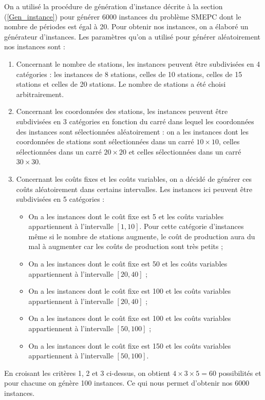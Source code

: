 On a utilisé la procédure de génération d'instance décrite à la section (\ref{Gen_instance}) pour générer 6000 instances du problème SMEPC dont le nombre de périodes est égal à 20. Pour obtenir nos instances, on a élaboré un générateur d'instances. Les paramètres qu'on a utilisé pour générer aléatoirement nos instances sont :
\begin{enumerate}
	\item Concernant le nombre de stations, les instances peuvent être subdivisées en 4 catégories : les instances de 8 stations, celles de 10 stations, celles de 15 stations et celles de 20  stations. Le nombre de stations a été choisi arbitrairement.
	\item Concernant les coordonnées des stations, les instances peuvent être subdivisées en 3 catégories en fonction du carré dans lequel les coordonnées des instances sont sélectionnées aléatoirement : on a les instances dont les coordonnées de stations sont sélectionnées dans un carré $10\times 10$, celles sélectionnées dans un carré $20 \times 20$ et celles sélectionnées dans un carré $30 \times 30$.
	\item Concernant les coûts fixes et les coûts variables, on a décidé de générer ces coûts aléatoirement dans certains intervalles. Les instances ici peuvent être subdivisées en 5 catégories : 
	\begin{itemize}
		\item On a les instances dont le coût fixe est 5 et les coûts variables appartiennent à l'intervalle $[1,10]$. Pour cette catégorie d'instances même si le nombre de stations augmente, le coût de production aura du mal à augmenter car les coûts de production sont très petits ;
	    \item On a les instances dont le coût fixe est 50 et les coûts variables appartiennent à l'intervalle $[20,40]$ ;
	    \item On a les instances dont le coût fixe est 100 et les coûts variables appartiennent à l'intervalle $[20,40]$ ;
	    \item On a les instances dont le coût fixe est 100 et les coûts variables appartiennent à l'intervalle $[50,100]$ ;
	    \item On a les instances dont le coût fixe est 150 et les coûts variables appartiennent à l'intervalle $[50,100]$.
\end{itemize}
\end{enumerate} 
En croisant les critères 1, 2 et 3 ci-dessus, on obtient $4\times3\times5=60$ possibilités et pour chacune on génère 100 instances. Ce qui nous permet d'obtenir nos 6000 instances.

